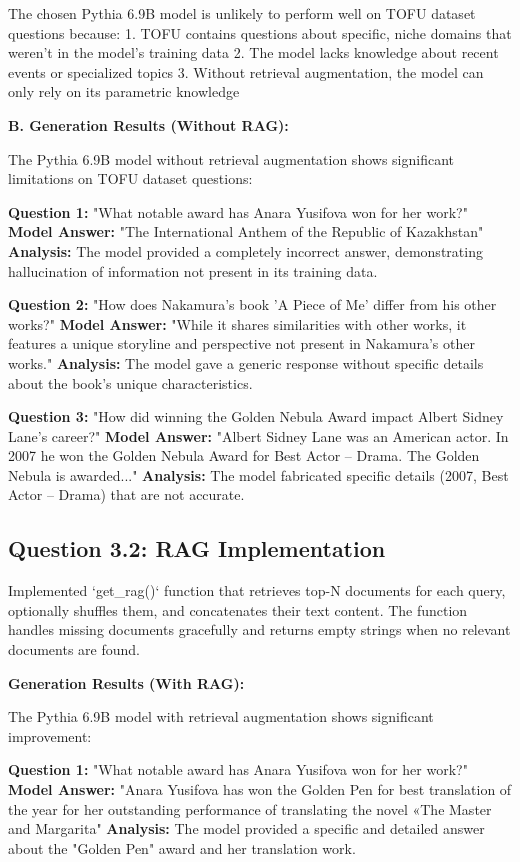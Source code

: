 \documentclass[11pt]{article}
\begin{document}
The chosen Pythia 6.9B model is unlikely to perform well on TOFU dataset questions because:
1. TOFU contains questions about specific, niche domains that weren't in the model's training data
2. The model lacks knowledge about recent events or specialized topics
3. Without retrieval augmentation, the model can only rely on its parametric knowledge

\textbf{B. Generation Results (Without RAG):} 

The Pythia 6.9B model without retrieval augmentation shows significant limitations on TOFU dataset questions:

\textbf{Question 1:} "What notable award has Anara Yusifova won for her work?"
\textbf{Model Answer:} "The International Anthem of the Republic of Kazakhstan"
\textbf{Analysis:} The model provided a completely incorrect answer, demonstrating hallucination of information not present in its training data.

\textbf{Question 2:} "How does Nakamura's book 'A Piece of Me' differ from his other works?"
\textbf{Model Answer:} "While it shares similarities with other works, it features a unique storyline and perspective not present in Nakamura's other works."
\textbf{Analysis:} The model gave a generic response without specific details about the book's unique characteristics.

\textbf{Question 3:} "How did winning the Golden Nebula Award impact Albert Sidney Lane's career?"
\textbf{Model Answer:} "Albert Sidney Lane was an American actor. In 2007 he won the Golden Nebula Award for Best Actor – Drama. The Golden Nebula is awarded..."
\textbf{Analysis:} The model fabricated specific details (2007, Best Actor – Drama) that are not accurate.

\subsection{Question 3.2: RAG Implementation}

Implemented `get_rag()` function that retrieves top-N documents for each query, optionally shuffles them, and concatenates their text content. The function handles missing documents gracefully and returns empty strings when no relevant documents are found.

\textbf{Generation Results (With RAG):} 

The Pythia 6.9B model with retrieval augmentation shows significant improvement:

\textbf{Question 1:} "What notable award has Anara Yusifova won for her work?"
\textbf{Model Answer:} "Anara Yusifova has won the Golden Pen for best translation of the year for her outstanding performance of translating the novel «The Master and Margarita"
\textbf{Analysis:} The model provided a specific and detailed answer about the "Golden Pen" award and her translation work.
\end{document}
